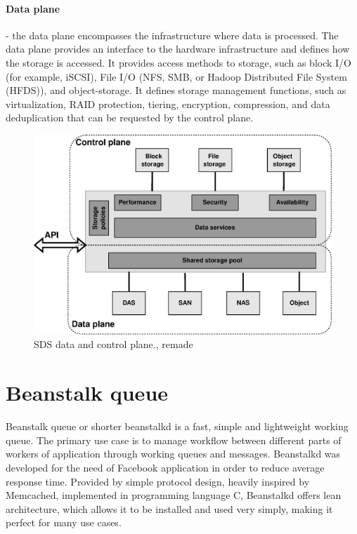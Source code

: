     \paragraph{Data plane}
    - the data plane encompasses the infrastructure where data is processed. The data plane provides an interface to the hardware infrastructure and defines how the storage is accessed. It provides access methods to storage, such as block I/O (for example, iSCSI), File I/O (NFS, SMB, or Hadoop Distributed File System (HFDS)), and object-storage. It defines storage management functions, such as virtualization, RAID protection, tiering, encryption, compression, and data deduplication that can be requested by the control plane\cite{sdsIBMSDSGuide}.

    \begin{figure}[hbt]
        \centering
        \includegraphics[width=1\textwidth]{obrazky-figures/sds-planes.eps}
        \caption{SDS data and control plane.\cite{sdsPlanes}, remade}
        \label{fig:sdsPlanes}
    \end{figure}

\section{Beanstalk queue}

    Beanstalk queue or shorter beanstalkd is a fast, simple and lightweight working queue\cite{beanstalkdOfficial}. The primary use case is to manage workflow between different parts of workers of application through working queues and messages. Beanstalkd was developed for the need of Facebook application in order to reduce average response time\cite{beanstalkdOfficial}. Provided by simple protocol design, heavily inspired by Memcached, implemented in programming language C, Beanstalkd offers lean architecture, which allows it to be installed and used very simply, making it perfect for many use cases\cite{beanstalkdInstall}.


